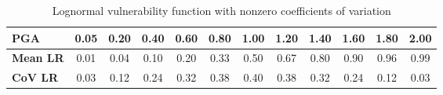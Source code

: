 \begin{table}[htbp]

\centering
\begin{tabular}{ l c c c c c c c c c c c}

\hline
\rowcolor{anti-flashwhite}
\bf{PGA} & 0.05 & 0.20 & 0.40 & 0.60 & 0.80 & 1.00 & 1.20 & 1.40 & 1.60 & 1.80 & 2.00 \\
\hline
\bf{Mean LR} & 0.01 & 0.04 & 0.10 & 0.20 & 0.33 & 0.50 & 0.67 & 0.80 & 0.90 & 0.96 & 0.99 \\
\bf{CoV LR} & 0.03 & 0.12 & 0.24 & 0.32 & 0.38 & 0.40 & 0.38 & 0.32 & 0.24 & 0.12 & 0.03 \\
\hline
\end{tabular}

\caption{Lognormal vulnerability function with nonzero coefficients of variation}
\label{tab:vf-ln-tax1-nzcov}
\end{table}